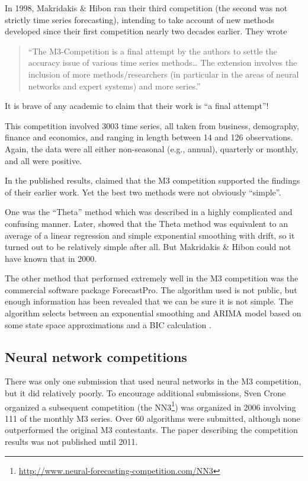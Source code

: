 \documentclass[11pt,a4paper,]{article}
\begin{document}
In 1998, Makridakis \& Hibon ran their third competition (the second was not strictly time series forecasting), intending to take account of new methods developed since their first competition nearly two decades earlier. They wrote

\begin{quote}
``The M3-Competition is a final attempt by the authors to settle the accuracy issue of various time series methods\ldots{} The extension involves the inclusion of more methods/researchers (in particular in the areas of neural networks and expert systems) and more series.''
\end{quote}

It is brave of any academic to claim that their work is ``a final attempt''!

This competition involved 3003 time series, all taken from business, demography, finance and economics, and ranging in length between 14 and 126 observations. Again, the data were all either non-seasonal (e.g., annual), quarterly or monthly, and all were positive.

In the published results, \autocite{M3} claimed that the M3 competition supported the findings of their earlier work. Yet the best two methods were not obviously ``simple''.

One was the ``Theta'' method which was described in a highly complicated and confusing manner. Later, \textcite{HB03} showed that the Theta method was equivalent to an average of a linear regression and simple exponential smoothing with drift, so it turned out to be relatively simple after all. But Makridakis \& Hibon could not have known that in 2000.

The other method that performed extremely well in the M3 competition was the commercial software package ForecastPro. The algorithm used is not public, but enough information has been revealed that we can be sure it is not simple. The algorithm selects between an exponential smoothing and ARIMA model based on some state space approximations and a BIC calculation \autocite{Goodrich2000}.

\hypertarget{neural-network-competitions}{%
\subsection*{Neural network competitions}\label{neural-network-competitions}}

There was only one submission that used neural networks in the M3 competition, but it did relatively poorly. To encourage additional submissions, Sven Crone organized a subsequent competition (the NN3\footnote{\url{http://www.neural-forecasting-competition.com/NN3}}) was organized in 2006 involving 111 of the monthly M3 series. Over 60 algorithms were submitted, although none outperformed the original M3 contestants. The paper describing the competition results \autocite{NN3} was not published until 2011.
\end{document}
